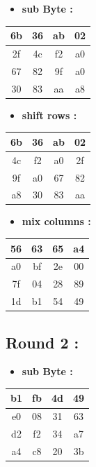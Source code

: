 \documentclass{article}
\begin{document}
\begin{itemize}
    \item \textbf{sub Byte :}
\end{itemize} \begin{tabular}{|c|c|c|c|}
\hline 6b & 36 & ab & 02 \\ \hline 2f & 4c & f2 & a0 \\ \hline 67 & 82 & 9f & a0 \\ \hline 30 & 83 & aa & a8 \\ \hline \end{tabular}\hspace{0.5cm}\vspace{0.1cm}\begin{itemize}
    \item \textbf{shift rows :}
\end{itemize} \begin{tabular}{|c|c|c|c|}
\hline 6b & 36 & ab & 02 \\ \hline 4c & f2 & a0 & 2f \\ \hline 9f & a0 & 67 & 82 \\ \hline a8 & 30 & 83 & aa \\ \hline \end{tabular}\hspace{0.5cm}\vspace{0.1cm}\begin{itemize}
    \item \textbf{mix columns :}
\end{itemize} \begin{tabular}{|c|c|c|c|}
\hline 56 & 63 & 65 & a4 \\ \hline a0 & bf & 2e & 00 \\ \hline 7f & 04 & 28 & 89 \\ \hline 1d & b1 & 54 & 49 \\ \hline \end{tabular}\hspace{0.5cm}\vspace{0.1cm}\subsection*{Round 2 : }\begin{itemize}
    \item \textbf{sub Byte :}
\end{itemize} \begin{tabular}{|c|c|c|c|}
\hline b1 & fb & 4d & 49 \\ \hline e0 & 08 & 31 & 63 \\ \hline d2 & f2 & 34 & a7 \\ \hline a4 & c8 & 20 & 3b \\ \hline \end{tabular}\hspace{0.5cm}\vspace{0.1cm}\begin{itemize}

\end{itemize}
\end{document}
